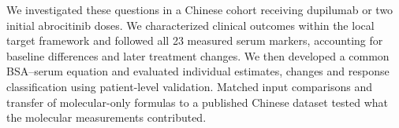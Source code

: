 We investigated these questions in a Chinese cohort receiving dupilumab or two initial abrocitinib doses. We characterized clinical outcomes within the local target framework and followed all 23 measured serum markers, accounting for baseline differences and later treatment changes. We then developed a common BSA--serum equation and evaluated individual estimates, changes and response classification using patient-level validation. Matched input comparisons and transfer of molecular-only formulas to a published Chinese dataset tested what the molecular measurements contributed.
